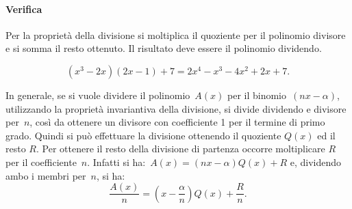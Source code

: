\paragraph{Verifica}
Per la proprietà della divisione si moltiplica il quoziente per il
polinomio divisore e si somma il resto ottenuto. Il risultato deve
essere il polinomio dividendo.

\[\left(x^{3}-2x\right)(2x-1)+7=2x^{4}-x^{3}-4x^{2}+2x+7.\]

In generale, se si vuole dividere il polinomio~$A(x)$ per il binomio~$(nx-\alpha)$, utilizzando la proprietà invariantiva della
divisione, si divide dividendo e divisore per~$n$, così da ottenere un divisore con coefficiente 1 per il termine di primo grado. Quindi si può effettuare la divisione ottenendo il quoziente $Q(x)$ ed il resto $R$. Per ottenere il resto della divisione di
partenza occorre moltiplicare $R$ per il coefficiente~$n$.
Infatti si ha:~$A(x)=(nx-\alpha)Q(x)+R $
e, dividendo ambo i membri per~$n$, si ha:
\[\frac{A(x)}{n}=\left(x-\frac{\alpha }{n}\right)Q(x)+\frac{R}{n}.\]
\ovalbox{\risolvii \ref{ese:12.13}, \ref{ese:12.14}, \ref{ese:12.15}, \ref{ese:12.16}, \ref{ese:12.17}, \ref{ese:12.18}}
\newpage


\cleardoublepage
